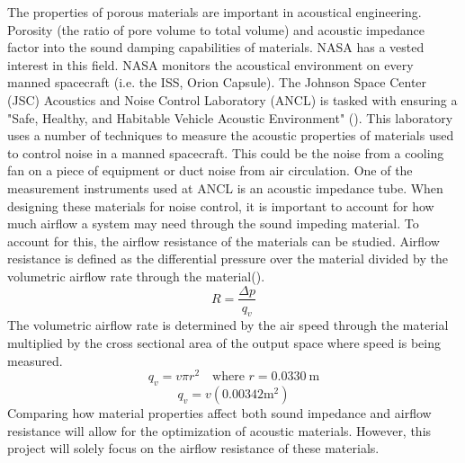 	The properties of porous materials are important in acoustical engineering. Porosity (the 
ratio of pore volume to total volume) and acoustic impedance factor into the sound damping 
capabilities of materials. NASA has a vested interest in this field. NASA monitors the acoustical 
environment on every manned spacecraft (i.e. the ISS, Orion Capsule). The Johnson Space Center 
(JSC) Acoustics and Noise Control Laboratory (ANCL) is tasked with ensuring a "Safe, Healthy, and 
Habitable Vehicle Acoustic Environment" (\cite{nasa_acoustics}). This laboratory uses a number of 
techniques to measure the acoustic properties of materials used to control noise in a manned 
spacecraft. This could be the noise from a cooling fan on a piece of equipment or duct noise from
air circulation. One of the measurement instruments used at ANCL is an acoustic impedance tube.
	When designing these materials for noise control, it is important to account 
for how much airflow a system may need through the sound impeding material. To account for this,
the airflow resistance of the materials can be studied. Airflow resistance is defined as the 
differential pressure over the material divided by the volumetric airflow rate through the 
material(\cite{liu2018numerical}).
\begin{equation} \label{Airflow Resistance} 
R= \frac{\Delta p}{q_v}
\end{equation}
The volumetric airflow rate is determined by the air speed through the material multiplied by the 
cross sectional area of the output space where speed is being measured.
\begin{equation}
q_v = v \pi r^2 \quad \text{where } r = 0.0330\ \mathrm{m}
\end{equation}
\begin{equation}
q_v = v(0.00342 \mathrm{m^2})
\end{equation}
Comparing how material properties affect both sound impedance and airflow resistance will allow for 
the optimization of acoustic materials. However, this project will solely focus on the airflow 
resistance of these materials. 
